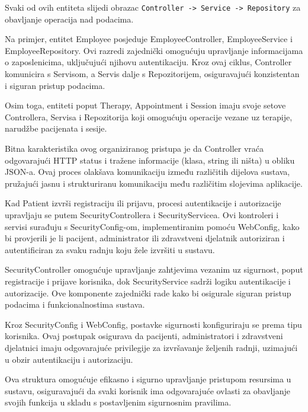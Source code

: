 Svaki od ovih entiteta slijedi obrazac  \verb|Controller -> Service -> Repository| za obavljanje operacija nad podacima.

Na primjer, entitet Employee posjeduje EmployeeController, EmployeeService i EmployeeRepository. Ovi razredi zajednički omogućuju upravljanje informacijama o zaposlenicima, uključujući njihovu autentikaciju. Kroz ovaj ciklus, Controller komunicira s Servisom, a Servis dalje s Repozitorijem, osiguravajući konzistentan i siguran pristup podacima.

Osim toga, entiteti poput Therapy, Appointment i Session imaju svoje setove Controllera, Servisa i Repozitorija koji omogućuju operacije vezane uz terapije, narudžbe pacijenata i sesije.

Bitna karakteristika ovog organiziranog pristupa je da Controller vraća odgovarajući HTTP status i tražene informacije (klasa, string ili ništa) u obliku JSON-a. Ovaj proces olakšava komunikaciju između različitih dijelova sustava, pružajući jasnu i strukturiranu komunikaciju među različitim slojevima aplikacije.

Kad Patient izvrši registraciju ili prijavu, procesi autentikacije i autorizacije upravljaju se putem SecurityControllera i SecurityServicea. Ovi kontroleri i servisi surađuju s SecurityConfig-om, implementiranim pomoću WebConfig, kako bi provjerili je li pacijent, administrator ili zdravstveni djelatnik autoriziran i autentificiran za svaku radnju koju žele izvršiti u sustavu.

SecurityController omogućuje upravljanje zahtjevima vezanim uz sigurnost, poput registracije i prijave korisnika, dok SecurityService sadrži logiku autentikacije i autorizacije. Ove komponente zajednički rade kako bi osigurale siguran pristup podacima i funkcionalnostima sustava.

Kroz SecurityConfig i WebConfig, postavke sigurnosti konfiguriraju se prema tipu korisnika. Ovaj postupak osigurava da pacijenti, administratori i zdravstveni djelatnici imaju odgovarajuće privilegije za izvršavanje željenih radnji, uzimajući u obzir autentikaciju i autorizaciju.

Ova struktura omogućuje efikasno i sigurno upravljanje pristupom resursima u sustavu, osiguravajući da svaki korisnik ima odgovarajuće ovlasti za obavljanje svojih funkcija u skladu s postavljenim sigurnosnim pravilima.\\

 

 

 

